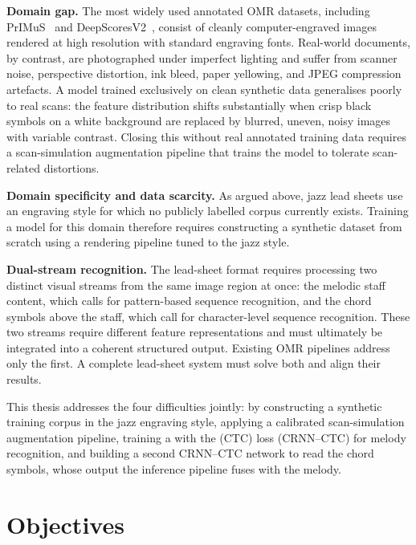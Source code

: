 \textbf{Domain gap.}
The most widely used annotated OMR datasets, including
PrIMuS~\cite{PrIMuSDataset} and DeepScoresV2~\cite{tuggenerDeepScoresV22020}, consist of
cleanly computer-engraved images rendered at high resolution with standard engraving
fonts. Real-world documents, by contrast, are photographed under imperfect lighting and
suffer from scanner noise, perspective distortion, ink bleed, paper yellowing, and JPEG
compression artefacts. A model trained exclusively on clean synthetic data generalises
poorly to real scans: the feature distribution shifts substantially when crisp black
symbols on a white background are replaced by blurred, uneven, noisy images with
variable contrast. Closing this  without real annotated training data
requires a scan-simulation augmentation pipeline that trains the model to tolerate
scan-related distortions.

\textbf{Domain specificity and data scarcity.}
As argued above, jazz lead sheets use an engraving style for which no publicly labelled
corpus currently exists. Training a model for this domain therefore requires
constructing a synthetic dataset from scratch using a rendering pipeline tuned to the
jazz style.

\textbf{Dual-stream recognition.}
The lead-sheet format requires processing two distinct visual streams from the same
image region at once: the melodic staff content, which calls for pattern-based sequence
recognition, and the chord symbols above the staff, which call for character-level
sequence recognition. These two
streams require different feature representations and must ultimately be integrated into
a coherent structured output. Existing OMR pipelines address only the first.
A complete lead-sheet system must solve both and align their results.

This thesis addresses the four difficulties jointly: by constructing a synthetic
training corpus in the jazz engraving style, applying a calibrated scan-simulation
augmentation pipeline, training a 
with the  (CTC) loss (CRNN--CTC) for melody
recognition, and building a second CRNN--CTC network to read the chord symbols, whose
output the inference pipeline fuses with the melody.

\section{Objectives}
\label{sec:objectives}

